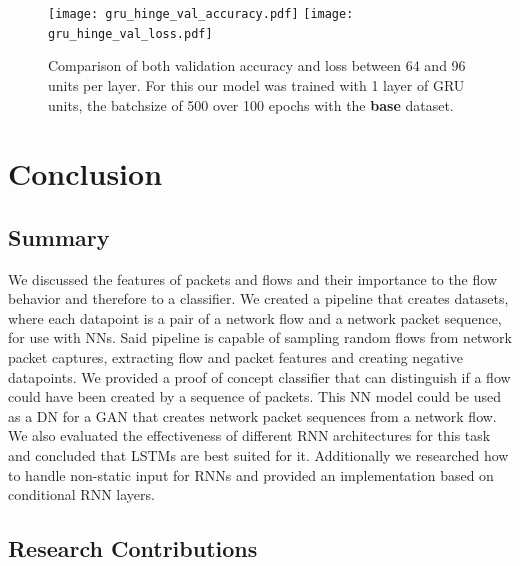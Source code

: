 \documentclass[
	ngerman,
	ruledheaders=section,%
	class=report,%
	thesis={type=bachelor},%
	accentcolor=9c,%
	custommargins=true,%
	marginpar=false,%
	parskip=half-,%
	fontsize=11pt,%
	twoside
]{tudapub}
\begin{document}
\begin{figure}
    \texttt{[image: gru\_hinge\_val\_accuracy.pdf]}
    \texttt{[image: gru\_hinge\_val\_loss.pdf]}
    \caption{Comparison of both validation accuracy and loss between 64 and 96 units per layer.
             For this our model was trained with 1 layer of GRU units, the batchsize of 500 over 100 epochs with the \textbf{base} dataset.}
    \label{fig:GRUhinge}
\end{figure}


\chapter{Conclusion}
\label{sec:conclusion}


\section{Summary}
\label{sec:summary}

We discussed the features of packets and flows and their importance to the flow behavior and therefore to a classifier.
We created a pipeline that creates datasets, where each datapoint is a pair of a network flow and a network packet sequence, for use with NNs.
Said pipeline is capable of sampling random flows from network packet captures, extracting flow and packet features and creating negative datapoints.
We provided a proof of concept classifier that can distinguish if a flow could have been created by a sequence of packets.
This NN model could be used as a DN for a GAN that creates network packet sequences from a network flow.
We also evaluated the effectiveness of different RNN architectures for this task
and concluded that LSTMs are best suited for it.
Additionally we researched how to handle non-static input for RNNs and provided an implementation based on conditional RNN layers.

\section{Research Contributions}
\label{sec:Contributions}
\end{document}
